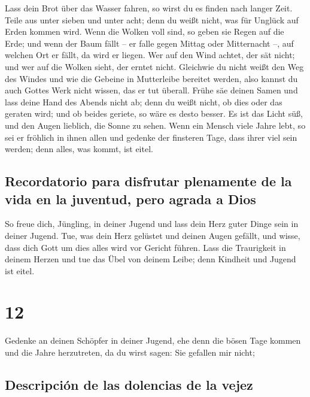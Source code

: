  Lass dein Brot über das Wasser fahren, so wirst du es
finden nach langer Zeit.  Teile aus unter sieben und unter
acht; denn du weißt nicht, was für Unglück auf Erden kommen wird.
 Wenn die Wolken voll sind, so geben sie Regen auf die
Erde; und wenn der Baum fällt -- er falle gegen Mittag oder Mitternacht
--, auf welchen Ort er fällt, da wird er liegen.  Wer auf
den Wind achtet, der sät nicht; und wer auf die Wolken sieht, der erntet
nicht.  Gleichwie du nicht weißt den Weg des Windes und
wie die Gebeine in Mutterleibe bereitet werden, also kannst du auch
Gottes Werk nicht wissen, das er tut überall.  Frühe säe
deinen Samen und lass deine Hand des Abends nicht ab; denn du weißt
nicht, ob dies oder das geraten wird; und ob beides geriete, so wäre es
desto besser.  Es ist das Licht süß, und den Augen
lieblich, die Sonne zu sehen.  Wenn ein Mensch viele Jahre
lebt, so sei er fröhlich in ihnen allen und gedenke der finsteren Tage,
dass ihrer viel sein werden; denn alles, was kommt, ist eitel.

\hypertarget{recordatorio-para-disfrutar-plenamente-de-la-vida-en-la-juventud-pero-agrada-a-dios}{%
\subsection{Recordatorio para disfrutar plenamente de la vida en la
juventud, pero agrada a
Dios}\label{recordatorio-para-disfrutar-plenamente-de-la-vida-en-la-juventud-pero-agrada-a-dios}}

 So freue dich, Jüngling, in deiner Jugend und lass dein
Herz guter Dinge sein in deiner Jugend. Tue, was dein Herz gelüstet und
deinen Augen gefällt, und wisse, dass dich Gott um dies alles wird vor
Gericht führen.  Lass die Traurigkeit in deinem Herzen
und tue das Übel von deinem Leibe; denn Kindheit und Jugend ist eitel.

\hypertarget{section-11}{%
\section{12}\label{section-11}}

 Gedenke an deinen Schöpfer in deiner Jugend, ehe denn die
bösen Tage kommen und die Jahre herzutreten, da du wirst sagen: Sie
gefallen mir nicht;

\hypertarget{descripciuxf3n-de-las-dolencias-de-la-vejez}{%
\subsection{Descripción de las dolencias de la
vejez}\label{descripciuxf3n-de-las-dolencias-de-la-vejez}}

